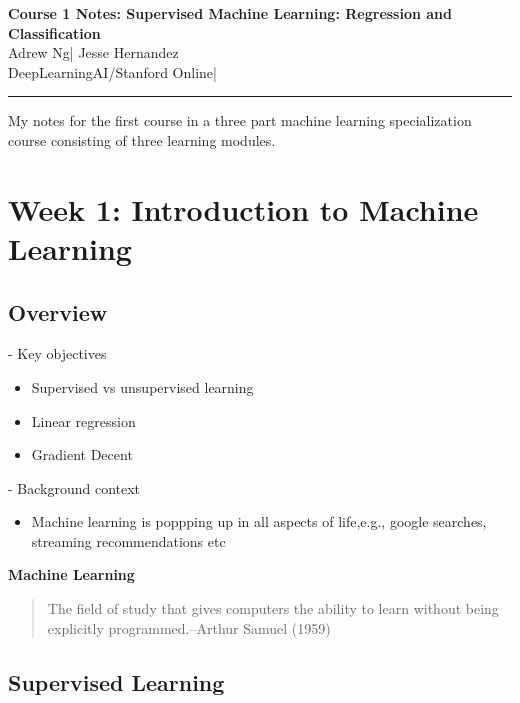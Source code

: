 \documentclass[11pt,letterpaper]{article}
\begin{document}
\begin{center}
    {\LARGE \textbf{Course 1 Notes: Supervised Machine Learning: Regression and Classification}}\\[0.5em]
    {\large Adrew Ng\quad | \quad Jesse Hernandez}\\[0.25em]
    {\small DeepLearningAI/Stanford Online\quad | }
\end{center}

\vspace{1em}
\hrule
\vspace{1em}

{\noindent\Large \color{blue} My notes for the first course in a three part machine learning specialization course consisting of three learning modules.}

\section{Week 1: Introduction to Machine Learning}

\subsection{Overview}
- Key objectives  
\begin{itemize}
	\item Supervised vs unsupervised learning
	\item Linear regression
	\item Gradient Decent
\end{itemize}

\noindent 
- Background context  
\begin{itemize}
	\item Machine learning is poppping up in all aspects of life,e.g., google searches, streaming recommendations etc
\end{itemize}

\begin{definitionbox}
	\textbf{Machine Learning}  
	\begin{quote}
		The field of study that gives computers the ability to learn without being explicitly programmed.\quad --Arthur Samuel (1959)
	\end{quote}
\end{definitionbox}

\subsection{Supervised Learning}
\end{document}
